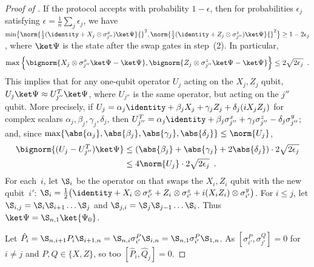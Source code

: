 \documentclass[11pt]{article}
\begin{document}
\begin{proof}[Proof of ]
If the protocol accepts with probability $1 - \epsilon$, then for probabilities $\epsilon_j$ satisfying $\epsilon = \tfrac{1}{n} \sum_j \epsilon_j$, we have $\min\!\big\{ \norm{\tfrac12 (\identity + X_j \otimes \sigma^x_{j''}) \ket \Psi}{}^2, \norm{\tfrac12 (\identity + Z_j \otimes \sigma^z_{j''}) \ket \Psi}{}^2 \big\} \geq 1 - 2  \epsilon_j$, where $\ket \Psi$ is the state after the swap gates in step~(2).  In particular, 
\begin{equation*}
\max\Big\{ \bignorm{X_j \otimes \sigma^x_{j''} \ket \Psi - \ket \Psi}, \bignorm{Z_j \otimes \sigma^z_{j''} \ket \Psi - \ket \Psi} \Big\} \leq 2 \sqrt{2 \epsilon_j}
 \enspace .
\end{equation*}
This implies that for any one-qubit operator $U_j$ acting on the $X_j, Z_j$ qubit, $U_j \ket \Psi \approx U_{j''}^T \ket \Psi$, where $U_{j''}$ is the same operator, but acting on the $j''$ qubit.  More precisely, if $U_j = \alpha_j \identity + \beta_j X_j + \gamma_j Z_j + \delta_j (i X_j Z_j)$ for complex scalars $\alpha_j, \beta_j, \gamma_j, \delta_j$, then $U_{j''}^T = \alpha_j \identity + \beta_j \sigma^x_{j''} + \gamma_j \sigma^z_{j''} - \delta_j \sigma^y_{j''}$; and, since $\max\{ \abs{\alpha_j}, \abs{\beta_j}, \abs{\gamma_j}, \abs{\delta_j} \} \leq \norm{U_j}$, 
\begin{align*}
\bignorm{(U_j - U_{j''}^T) \ket \Psi} 
&\leq (\abs{\beta_j} + \abs{\gamma_j} + 2 \abs{\delta_j}) \cdot 2 \sqrt{2 \epsilon_j} \\
&\leq 4 \norm{U_j} \cdot 2 \sqrt{2  \epsilon_j}
 \enspace .
\end{align*}
For each~$i$, let $\S_i$ be the operator on that swaps the $X_i, Z_i$ qubit with the new qubit~$i'$: $\S_i = \frac12 \big( \identity + X_i \otimes \sigma^x_{i'} + Z_i \otimes \sigma^z_{i'} + i (X_i Z_i) \otimes \sigma^y_{i'} \big)$.  
For $i \leq j$, let $\S_{i,j} = \S_i \S_{i+1} \ldots \S_j$ and $\S_{j,i} = \S_j \S_{j-1} \ldots \S_i$.  Thus $\ket \Psi = \S_{n,1} \ket{\Psi_0}$.  

Let $\hat P_i = \S_{n,i+1} P_i \S_{i+1,n} = \S_{n,i} \sigma^P_{i'} \S_{i,n} = \S_{n,1} \sigma^P_{i'} \S_{1,n}$.  As $[\sigma^P_{i'}, \sigma^Q_{j'}] = 0$ for $i \neq j$ and $P, Q \in \{X, Z\}$, so too $[\hat P_i, \hat Q_j] = 0$.  


\end{proof}
\end{document}
